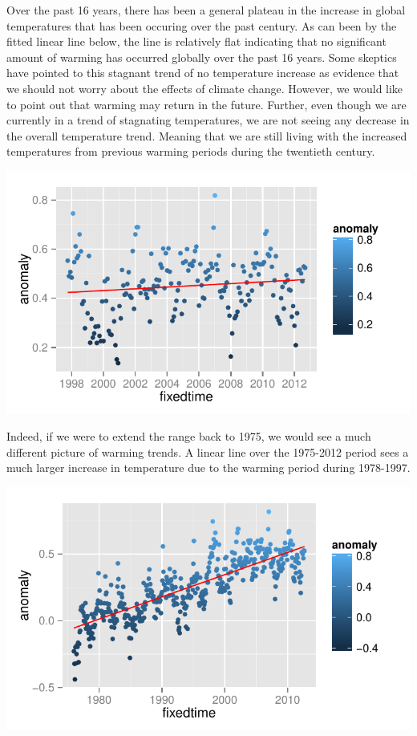 \documentclass{article}\usepackage{graphicx, color}
\newenvironment{knitrout}{}{} %
\begin{document}
Over the past 16 years, there has been a general plateau in the increase in global temperatures that has been occuring over the past century. As can been by the fitted linear line below, the line is relatively flat indicating that no significant amount of warming has occurred globally over the past 16 years. Some skeptics have pointed to this stagnant trend of no temperature increase as evidence that we should not worry about the effects of climate change. However, we would like to point out that warming may return in the future. Further, even though we are currently in a trend of stagnating temperatures, we are not seeing any decrease in the overall temperature trend. Meaning that we are still living with the increased temperatures from previous warming periods during the twentieth century.


\begin{knitrout}
\color{fgcolor}\includegraphics[width=\linewidth]{figure/15-years} 
\end{knitrout}


Indeed, if we were to extend the range back to 1975, we would see a much different picture of warming trends. A linear line over the 1975-2012 period sees a much larger increase in temperature due to the warming period during 1978-1997.

\begin{knitrout}
\color{fgcolor}\includegraphics[width=\linewidth]{figure/recent-trend} 
\end{knitrout}
\end{document}

